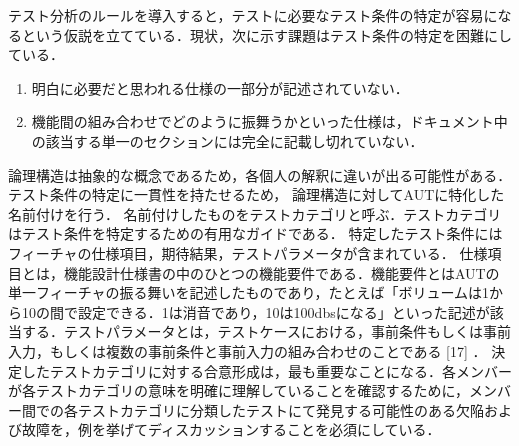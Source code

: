 \documentclass[a4paper,12pt]{jreport}
\begin{document}
テスト分析のルールを導入すると，テストに必要なテスト条件の特定が容易になるという仮説を立てている．現状，次に示す課題はテスト条件の特定を困難にしている．
\begin{enumerate}
\item 明白に必要だと思われる仕様の一部分が記述されていない．
\item 機能間の組み合わせでどのように振舞うかといった仕様は，ドキュメント中の該当する単一のセクションには完全に記載し切れていない．
\end{enumerate}


 論理構造は抽象的な概念であるため，各個人の解釈に違いが出る可能性がある．テスト条件の特定に一貫性を持たせるため， 論理構造に対してAUTに特化した名前付けを行う．
名前付けしたものをテストカテゴリと呼ぶ．テストカテゴリはテスト条件を特定するための有用なガイドである．
特定したテスト条件にはフィーチャの仕様項目，期待結果，テストパラメータが含まれている．
仕様項目とは，機能設計仕様書の中のひとつの機能要件である．機能要件とはAUTの単一フィーチャの振る舞いを記述したものであり，たとえば「ボリュームは1から10の間で設定できる．1は消音であり，10は100dbsになる」といった記述が該当する．テストパラメータとは，テストケースにおける，事前条件もしくは事前入力，もしくは複数の事前条件と事前入力の組み合わせのことである [17] ．
      決定したテストカテゴリに対する合意形成は，最も重要なことになる．各メンバーが各テストカテゴリの意味を明確に理解していることを確認するために，メンバー間での各テストカテゴリに分類したテストにて発見する可能性のある欠陥および故障を，例を挙げてディスカッションすることを必須にしている．
\end{document}
